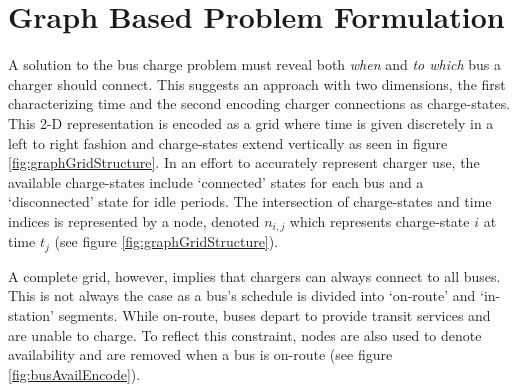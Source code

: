 \section{Graph Based Problem Formulation}
A solution to the bus charge problem must reveal both \textit{when} and \textit{to which} bus a charger should connect. This suggests an approach with two dimensions, the first characterizing time and the second encoding charger connections as charge-states. This 2-D representation is encoded as a grid where time is given discretely in a left to right fashion and charge-states extend vertically as seen in figure \ref{fig:graphGridStructure}. In an effort to accurately represent charger use, the available charge-states include `connected' states for each bus and a `disconnected' state for idle periods. The intersection of charge-states and time indices is represented by a node, denoted $n_{i,j}$ which represents charge-state $i$ at time $t_j$ (see figure \ref{fig:graphGridStructure}).  
\par A complete grid, however, implies that chargers can always connect to all buses.  This is not always the case as a bus's schedule is divided into `on-route' and `in-station' segments. While on-route, buses depart to provide transit services and are unable to charge. To reflect this constraint, nodes are also used to denote availability and are removed when a bus is on-route (see figure \ref{fig:busAvailEncode}). 

